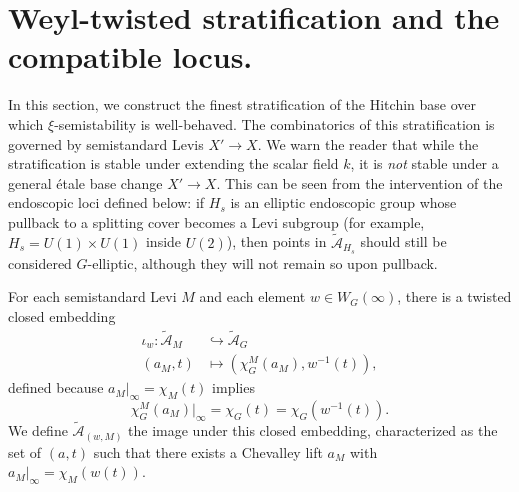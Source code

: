 \documentclass[openany]{amsbook}
\theoremstyle{definition}
\theoremstyle{remark}
\numberwithin{equation}{section}
\newcommand{\cA}{\mathcal{A}}
\renewcommand{\-}{\operatorname{-}}
\newcommand{\ctA}{\widetilde{\cA}}
\newcommand{\ctAt}[2]{\ctA_{(#1,#2)}}
\begin{document}
\section{Weyl-twisted stratification and the compatible locus.}

In this section, we construct the finest stratification of the Hitchin base over which $\xi$-semistability is well-behaved. The combinatorics of this stratification is governed by semistandard Levis $X' \to X$. We warn the reader that while the stratification is stable under extending the scalar field $k$, it is \textit{not} stable under a general \'etale base change $X' \to X$. This can be seen from the intervention of the endoscopic loci defined below: if $H_s$ is an elliptic endoscopic group whose pullback to a splitting cover becomes a Levi subgroup (for example, $H_{s} = U(1) \times U(1)$ inside $U(2)$), then points in $\ctA_{H_s}$ should still be considered $G$-elliptic, although they will not remain so upon pullback.

For each semistandard Levi $M$ and each element $w \in W_G(\infty)$, there is a twisted closed embedding
\begin{align*}
    \iota_w : \ctA_M &\hookrightarrow \ctA_G \\
        (a_M, t) &\mapsto (\chi^M_G(a_M), w^{-1}(t)),
\end{align*}
defined because $a_M|_{\infty} = \chi_M(t)$ implies 
\[
    \chi^M_G(a_M)|_{\infty} = \chi_G(t) = \chi_G(w^{-1}(t)).
\]
We define $\ctAt{w}{M}$ the image under this closed embedding, characterized as the set of $(a,t)$ such that there exists a Chevalley lift $a_M$ with $a_M|_\infty = \chi_M(w(t))$. 
\end{document}
